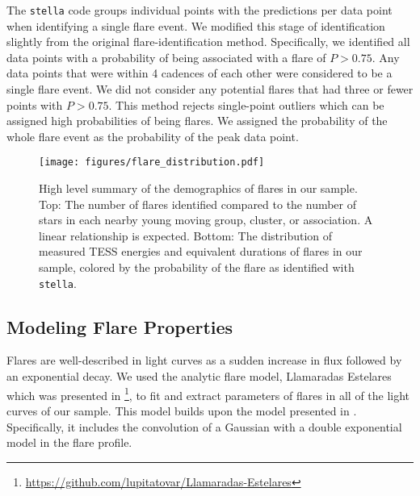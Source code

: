 \documentclass[twocolumn]{aastex631}
\begin{document}
The \texttt{stella} code groups individual points with the predictions per data point
when identifying a single flare event. We modified this stage of identification slightly
from the original flare-identification method. Specifically, we identified all data
points with a probability of being associated with a flare of $P > 0.75$. Any data
points that were within 4 cadences of each other were considered to be a single flare
event. We did not consider any potential flares that had three or fewer points with
$P > 0.75$. This method rejects single-point outliers which can be assigned  high
probabilities of being  flares. We assigned the probability of the whole flare event
as the probability of the peak data point.

\begin{figure}[ht!]
    \begin{centering}
        \texttt{[image: figures/flare\_distribution.pdf]}
        \caption{
            High level summary of the demographics of flares in our sample. Top: The number of flares identified compared to the number of stars in each nearby young moving group, cluster,
            or association. A linear relationship is expected. Bottom: The distribution of measured TESS energies
            and equivalent durations of flares in our sample, colored by the probability of the flare as identified with \texttt{stella}.
        }
        \label{fig:flare_distribution}
    \end{centering}
\end{figure}


\subsection{Modeling Flare Properties}\label{subsec2:model}

Flares are well-described in light curves as a sudden increase in flux followed
by an exponential decay. We used the analytic flare model, Llamaradas Estelares
which was presented in \cite{tovar22}\footnote{\url{https://github.com/lupitatovar/Llamaradas-Estelares}},
to fit and extract parameters of flares in all of the light curves of our sample.
This model builds upon the model presented in \cite{davenport14}. Specifically,
it includes the convolution of a Gaussian with a double exponential model in the
flare profile.
\end{document}
